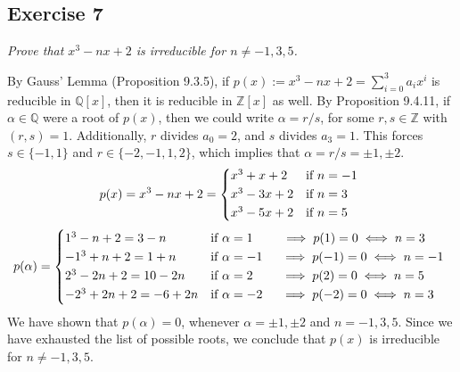 \subsection*{Exercise 7}
\begin{framed}
\textit{Prove that $x^3 - nx + 2$ is irreducible for $n \not= -1, 3, 5$.}
\end{framed}

By Gauss' Lemma (Proposition 9.3.5), if $p(x) := x^3 - nx + 2 = \sum_{i=0}^3a_ix^i$ is reducible in $\mathbb{Q}[x]$, then it is reducible in $\mathbb{Z}[x]$ as well. By Proposition 9.4.11, if $\alpha \in \mathbb{Q}$ were a root of $p(x)$, then we could write $\alpha = r/s$, for some $r, s \in \mathbb{Z}$ with $(r, s) = 1$. Additionally, $r$ divides $a_0 = 2$, and $s$ divides $a_3 = 1$. This forces $s \in \{-1, 1\}$ and $r \in \{-2, -1, 1, 2\}$, which implies that $\alpha = r/s = \pm 1, \pm 2$.
\begin{equation*}
    p(x) = x^3 - nx + 2 =
    \begin{cases*}
    x^3 + x + 2 & if $n = -1$ \\
    x^3 - 3x + 2 & if $n = 3$ \\
    x^3 - 5x + 2 & if $n = 5$
    \end{cases*}
\end{equation*}
\begin{equation*}
    p(\alpha) = 
    \begin{cases*}
    1^3 - n + 2 = 3 - n & if $\alpha = 1 \hspace{7.5 mm} \implies p(1) = 0 \iff n = 3$ \\
    -1^3 + n + 2 = 1 + n & if $\alpha = -1 \hspace{4.5 mm} \implies p(-1) = 0 \iff n = -1$ \\
    2^3 - 2n + 2 = 10 - 2n & if $\alpha = 2 \hspace{7.25 mm} \implies p(2) = 0 \iff n = 5$ \\
    -2^3 + 2n + 2 = -6 + 2n & if $\alpha = -2 \hspace{4.5 mm} \implies p(-2) = 0 \iff n = 3$
    \end{cases*}
\end{equation*}
We have shown that $p(\alpha) = 0$, whenever $\alpha = \pm 1, \pm 2$ and $n = -1, 3, 5$. Since we have exhausted the list of possible roots, we conclude that $p(x)$ is irreducible for $n \not= -1, 3, 5$.